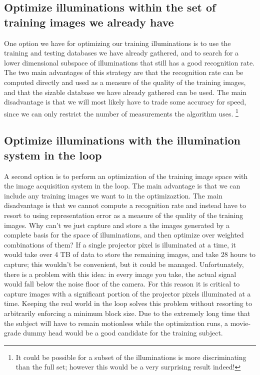 \subsection{Optimize illuminations within the set of training images we already have}
One option we have for optimizing our training illuminations is to use the
training and testing databases we have already gathered, and to search for a
lower dimensional subspace of illuminations that still has a good recognition
rate.  The two main advantages of this strategy are that the recognition rate
can be computed directly and used as a measure of the quality of the training
images, and that the sizable database we have already gathered can be used.
The main disadvantage is that we will most likely have to trade some accuracy
for speed, since we can only restrict the number of measurements the algorithm
uses. \footnote{It could be possible for a subset of the illuminations is more
discriminating than the full set; however this would be a very surprising
result indeed!}

\subsection{Optimize illuminations with the illumination system in the loop}
A second option is to perform an optimization of the training image space with
the image acquisition system in the loop.  The main advantage is that we can
include any training images we want to in the optimizaztion.  The main
disadvantage is that we cannot compute a recognition rate and instead have to
resort to using representation error as a measure of the quality of the
training images.  Why can't we just capture and store a the images generated by
a complete basis for the space of illuminations, and then optimize over
weighted combinations of them?  If a single projector pixel is illuminated at a
time, it would take over 4 TB of data to store the remaining images, and take
28 hours to capture; this wouldn't be convenient, but it could be managed.
Unfortunately, there is a problem with this idea:  in every image you take, the
actual signal would fall below the noise floor of the camera.  For this reason
it is critical to capture images with a significant portion of the projector
pixels illuminated at a time.  Keeping the real world in the loop solves this
problem without resorting to arbitrarily enforcing a minimum block size.  Due
to the extremely long time that the subject will have to remain motionless
while the optimization runs, a movie-grade dummy head would be a good candidate
for the training subject.  

